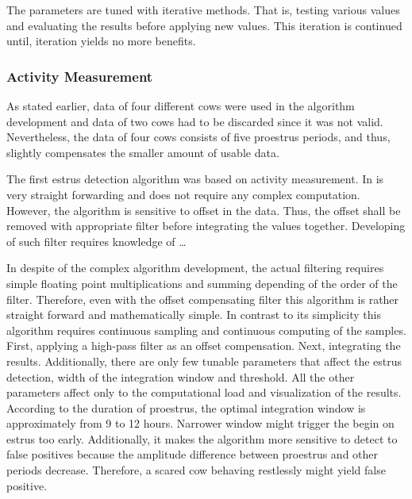 \documentclass[english,12pt,a4paper,pdftex,elec,utf8]{aaltothesis}
\begin{document}
The parameters are tuned with iterative methods. That is, testing various values and evaluating the results before applying new values. This iteration is continued until, iteration yields no more benefits.


\subsubsection{Activity Measurement} \label{activitymeasurementevaluation}

As stated earlier, data of four different cows were used in the algorithm development and data of two cows had to be discarded since it was not valid. Nevertheless, the data of four cows consists of five proestrus periods, and thus, slightly compensates the smaller amount of usable data.

The first estrus detection algorithm was based on activity measurement. In is very straight forwarding and does not require any complex computation. However, the algorithm is sensitive to offset in the data. Thus, the offset shall be removed with appropriate filter before integrating the values together. Developing of such filter requires knowledge of \dots

In despite of the complex algorithm development, the actual filtering requires simple floating point multiplications and summing depending of the order of the filter. Therefore, even with the offset compensating filter this algorithm is rather straight forward and mathematically simple. In contrast to its simplicity this algorithm requires continuous sampling and continuous computing of the samples. First, applying a high-pass filter as an offset compensation. Next, integrating the results. Additionally, there are only few tunable parameters that affect the estrus detection, width of the integration window and threshold. All the other parameters affect only to the computational load and visualization of the results.\\

According to the duration of proestrus, the optimal integration window is approximately from 9 to 12 hours. Narrower window might trigger the begin on estrus too early. Additionally, it makes the algorithm more sensitive to detect to false positives because the amplitude difference between proestrus and other periods decrease. Therefore, a scared cow behaving restlessly might yield false positive.
\end{document}
